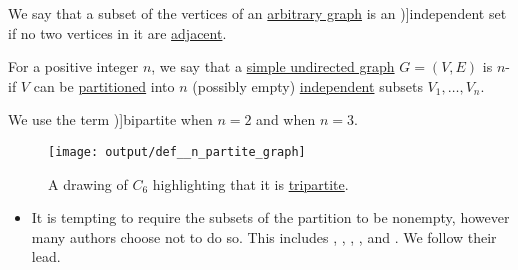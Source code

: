 \begin{definition}\label{def:graph_independent_set}
  We say that a subset of the vertices of an \hyperref[rem:arbitrary_graph]{arbitrary graph} is an \term[bg=независимо множество (\cite[103]{Мирчев2001})]{independent set} if no two vertices in it are \hyperref[def:graph_adjacency]{adjacent}.
\end{definition}

\begin{definition}\label{def:n_partite_graph}
  For a positive integer \( n \), we say that a \hyperref[def:undirected_graph]{simple undirected graph} \( G = (V, E) \) is \( n \)- if \( V \) can be \hyperref[def:set_partition]{partitioned} into \( n \) (possibly empty) \hyperref[def:graph_independent_set]{independent} subsets \( V_1, \ldots, V_n \).

  We use the term \term[ru=двудольный (граф) (\cite[177]{Зыков2004})]{bipartite} when \( n = 2 \) and  when \( n = 3 \).

  \begin{figure}[!ht]
    \centering
    \texttt{[image: output/def\_\_n\_partite\_graph]}
    \caption{A drawing of \hyperref[def:cycle_graph]{\( C_6 \)} highlighting that it is \hyperref[def:n_partite_graph]{tripartite}.}\label{fig:def:n_partite_graph}
  \end{figure}
\end{definition}
\begin{itemize}
  \item It is tempting to require the subsets of the partition to be nonempty, however many authors choose not to do so. This includes , , , ,  and . We follow their lead.
\end{itemize}

